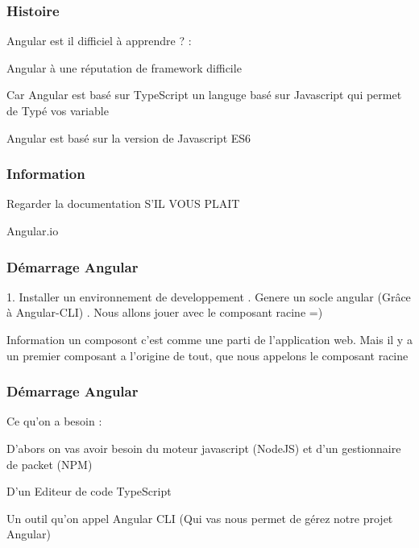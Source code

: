 \documentclass[10pt]{beamer}
\begin{document}
	\begin{frame}
		\frametitle{Histoire}

		Angular est il difficiel à apprendre ? : \newline \newline

		Angular à une réputation de framework difficile \newline \newline

		Car Angular est basé sur TypeScript un languge basé sur Javascript qui permet de Typé vos variable \newline \newline

		Angular est basé sur la version de Javascript ES6

	\end{frame}

	\begin{frame}
		\frametitle{Information}
		\centering
		Regarder la documentation
		S'IL VOUS PLAIT

		Angular.io

	\end{frame}


	\begin{frame}
		\frametitle{Démarrage Angular}

		1. Installer un environnement de developpement . Genere un socle angular (Grâce à Angular-CLI) . Nous allons jouer avec le composant racine =)
		\newline \newline
		\begin{block}{Information}
			un composont c’est comme une parti de l’application web. Mais il y a un premier composant a l'origine de tout, que nous appelons le composant racine
		\end{block}

	\end{frame}

	\begin{frame}
		\frametitle{Démarrage Angular}

		Ce qu'on a besoin : \newline \newline

		D'abors on vas avoir besoin du moteur javascript (NodeJS) et d'un gestionnaire de packet (NPM) \newline \newline

		D'un Editeur de code TypeScript \newline \newline

		Un outil qu'on appel Angular CLI (Qui vas nous permet de gérez notre projet Angular)

	\end{frame}
\end{document}
